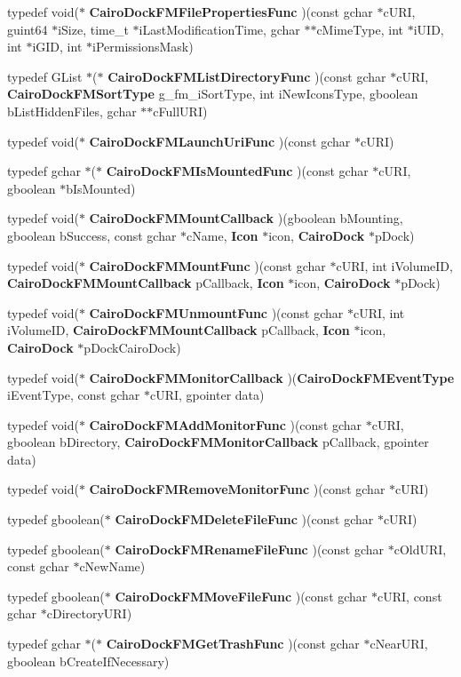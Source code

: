 \begin{CompactItemize}
\item 
typedef void($\ast$ {\bf CairoDockFMFilePropertiesFunc} )(const gchar $\ast$cURI, guint64 $\ast$iSize, time\_\-t $\ast$iLastModificationTime, gchar $\ast$$\ast$cMimeType, int $\ast$iUID, int $\ast$iGID, int $\ast$iPermissionsMask)
\item 
typedef GList $\ast$($\ast$ {\bf CairoDockFMListDirectoryFunc} )(const gchar $\ast$cURI, {\bf CairoDockFMSortType} g\_\-fm\_\-iSortType, int iNewIconsType, gboolean bListHiddenFiles, gchar $\ast$$\ast$cFullURI)
\item 
typedef void($\ast$ {\bf CairoDockFMLaunchUriFunc} )(const gchar $\ast$cURI)
\item 
typedef gchar $\ast$($\ast$ {\bf CairoDockFMIsMountedFunc} )(const gchar $\ast$cURI, gboolean $\ast$bIsMounted)
\item 
typedef void($\ast$ {\bf CairoDockFMMountCallback} )(gboolean bMounting, gboolean bSuccess, const gchar $\ast$cName, {\bf Icon} $\ast$icon, {\bf CairoDock} $\ast$pDock)
\item 
typedef void($\ast$ {\bf CairoDockFMMountFunc} )(const gchar $\ast$cURI, int iVolumeID, {\bf CairoDockFMMountCallback} pCallback, {\bf Icon} $\ast$icon, {\bf CairoDock} $\ast$pDock)
\item 
typedef void($\ast$ {\bf CairoDockFMUnmountFunc} )(const gchar $\ast$cURI, int iVolumeID, {\bf CairoDockFMMountCallback} pCallback, {\bf Icon} $\ast$icon, {\bf CairoDock} $\ast$pDockCairoDock)
\item 
typedef void($\ast$ {\bf CairoDockFMMonitorCallback} )({\bf CairoDockFMEventType} iEventType, const gchar $\ast$cURI, gpointer data)
\item 
typedef void($\ast$ {\bf CairoDockFMAddMonitorFunc} )(const gchar $\ast$cURI, gboolean bDirectory, {\bf CairoDockFMMonitorCallback} pCallback, gpointer data)
\item 
typedef void($\ast$ {\bf CairoDockFMRemoveMonitorFunc} )(const gchar $\ast$cURI)
\item 
typedef gboolean($\ast$ {\bf CairoDockFMDeleteFileFunc} )(const gchar $\ast$cURI)
\item 
typedef gboolean($\ast$ {\bf CairoDockFMRenameFileFunc} )(const gchar $\ast$cOldURI, const gchar $\ast$cNewName)
\item 
typedef gboolean($\ast$ {\bf CairoDockFMMoveFileFunc} )(const gchar $\ast$cURI, const gchar $\ast$cDirectoryURI)
\item 
typedef gchar $\ast$($\ast$ {\bf CairoDockFMGetTrashFunc} )(const gchar $\ast$cNearURI, gboolean bCreateIfNecessary)

\end{CompactItemize}
